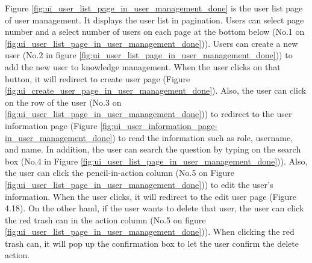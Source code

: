 \documentclass[12pt,oneside,openright,a4paper]{cpe-english-project}
\begin{document}
Figure  \ref*{fig:ui_user_list_page_in_user_management_done} is the user list page of user management. It displays the user list in pagination. Users can select page number and a select number of users on each page at the bottom below (No.1 on  \ref*{fig:ui_user_list_page_in_user_management_done})). Users can create a new user (No.2 in figure  \ref*{fig:ui_user_list_page_in_user_management_done})) to add the new user to knowledge management. When the user clicks on that button, it will redirect to create user page (Figure  \ref*{fig:ui_create_user_page_in_user_management_done}). Also, the user can click on the row of the user (No.3 on  \ref*{fig:ui_user_list_page_in_user_management_done})) to redirect to the user information page (Figure \ref*{fig:ui_user_information_page-in_user_management_done}) to read the information such as role, username, and name. In addition, the user can search the question by typing on the search box (No.4 in Figure  \ref*{fig:ui_user_list_page_in_user_management_done})). Also, the user can click the pencil-in-action column (No.5 on Figure  \ref*{fig:ui_user_list_page_in_user_management_done})) to edit the user's information. When the user clicks, it will redirect to the edit user page (Figure 4.18). On the other hand, if the user wants to delete that user, the user can click the red trash can in the action column (No.5 on figure  \ref*{fig:ui_user_list_page_in_user_management_done})). When clicking the red trash can, it will pop up the confirmation box to let the user confirm the delete action. \\
\end{document}
